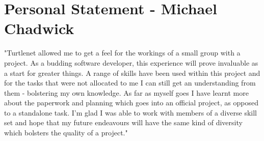 \documentclass{report}
{\normalsize}
\begin{document}
\chapter{Personal Statement - Michael Chadwick}
"Turtlenet allowed me to get a feel for the workings of a small group with a
 project.  As a budding software developer, this experience will prove
 invaluable as a start for greater things.
 A range of skills have been used within this project and for the tasks that
 were not allocated to me I can still get an understanding from them - 
 bolstering my own knowledge.
 As far as myself goes I have learnt more about the paperwork and planning which
 goes into an official project, as opposed to a standalone task.
 I'm glad I was able to work with members of a diverse skill set and hope that
 my future endeavours will have the same kind of diversity which bolsters the
 quality of a project."
\end{document}
